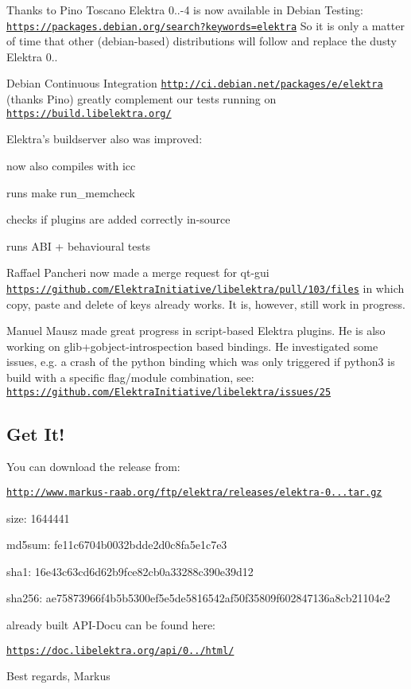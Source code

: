 Thanks to Pino Toscano Elektra 0..-\/4 is now available in Debian Testing\+: \href{https://packages.debian.org/search?keywords=elektra}{\tt https\+://packages.\+debian.\+org/search?keywords=elektra} So it is only a matter of time that other (debian-\/based) distributions will follow and replace the dusty Elektra 0..

Debian Continuous Integration \href{http://ci.debian.net/packages/e/elektra}{\tt http\+://ci.\+debian.\+net/packages/e/elektra} (thanks Pino) greatly complement our tests running on \href{https://build.libelektra.org/}{\tt https\+://build.\+libelektra.\+org/}

Elektra’s buildserver also was improved\+:


\begin{DoxyItemize}
\item now also compiles with icc
\item runs make run\+\_\+memcheck
\item checks if plugins are added correctly in-\/source
\item runs A\+BI + behavioural tests
\end{DoxyItemize}

Raffael Pancheri now made a merge request for qt-\/gui \href{https://github.com/ElektraInitiative/libelektra/pull/103/files}{\tt https\+://github.\+com/\+Elektra\+Initiative/libelektra/pull/103/files} in which copy, paste and delete of keys already works. It is, however, still work in progress.

Manuel Mausz made great progress in script-\/based Elektra plugins. He is also working on glib+gobject-\/introspection based bindings. He investigated some issues, e.\+g. a crash of the python binding which was only triggered if python3 is build with a specific flag/module combination, see\+: \href{https://github.com/ElektraInitiative/libelektra/issues/25}{\tt https\+://github.\+com/\+Elektra\+Initiative/libelektra/issues/25}

\subsection*{Get It!}

You can download the release from\+:

\href{http://www.markus-raab.org/ftp/elektra/releases/elektra-0.8.8.tar.gz}{\tt http\+://www.\+markus-\/raab.\+org/ftp/elektra/releases/elektra-\/0...\+tar.\+gz}


\begin{DoxyItemize}
\item size\+: 1644441
\item md5sum\+: fe11c6704b0032bdde2d0c8fa5e1c7e3
\item sha1\+: 16e43c63cd6d62b9fce82cb0a33288c390e39d12
\item sha256\+: ae75873966f4b5b5300ef5e5de5816542af50f35809f602847136a8cb21104e2
\end{DoxyItemize}

already built A\+P\+I-\/\+Docu can be found here\+:

\href{https://doc.libelektra.org/api/0.8.8/html/}{\tt https\+://doc.\+libelektra.\+org/api/0../html/}

Best regards, Markus 